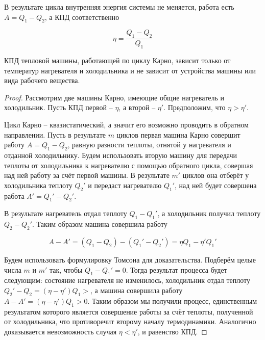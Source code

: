 В результате цикла внутренняя энергия системы не меняется, работа есть $A = Q_1 - Q_2$, а КПД соответственно

\begin{equation}
    \eta = \frac{Q_1 - Q_2}{Q_1}
\end{equation}

\begin{theorem}
    КПД тепловой машины, работающей по циклу Карно, зависит только от температур нагревателя и холодильника и не зависит от устройства машины или вида рабочего вещества.
\end{theorem}

\begin{proof}
    Рассмотрим две машины Карно, имеющие общие нагреватель и холодильник. Пусть КПД первой -- $\eta$, а второй -- $\eta'$. Предположим, что $\eta > \eta'$.

    Цикл Карно -- квазистатический, а значит его возможно проводить в обратном направлении. Пусть в результате $m$ циклов первая машина Карно совершит работу $A = Q_1 - Q_2$, равную разности теплоты, отнятой у нагревателя и отданной холодильнику. Будем использовать вторую машину для передачи теплоты от холодильника к нагревателю с помощью обратного цикла, совершая над ней работу за счёт первой машины. В результате $m'$ циклов она отберёт у холодильника теплоту $Q_2'$ и передаст нагревателю $Q_1'$, над ней будет совершена работа $A' = Q_1' - Q_2'$.

    В результате нагреватель отдал теплоту $Q_1 - Q_1'$, а холодильник получил теплоту $Q_2-Q_2'$. Таким образом машина совершила работу

    \begin{equation*}
        A - A' = (Q_1 - Q_2) - (Q_1' - Q_2') = \eta Q_1 - \eta' Q_1'
    \end{equation*}

    Будем использовать формулировку Томсона для доказательства. Подберём целые числа $m$ и $m'$ так, чтобы $Q_1 - Q_1' = 0$. Тогда результат процесса будет следующим: состояние нагревателя не изменилось, холодильник отдал теплоту $Q_2' - Q_2 = (\eta - \eta') Q_1 > $, а машина совершила работу $A - A' = (\eta - \eta') Q_1 > 0$. Таким образом мы получили процесс, единственным результатом которого является совершение работы за счёт теплоты, полученной от холодильника, что противоречит второму началу термодинамики. Аналогично доказывается невозможность случая $\eta < \eta'$, и равенство КПД.
\end{proof}

